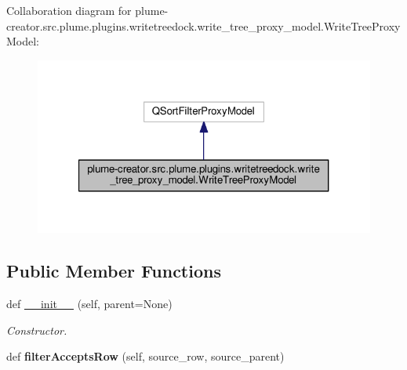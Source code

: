 Collaboration diagram for plume-\/creator.src.\+plume.\+plugins.\+writetreedock.\+write\+\_\+tree\+\_\+proxy\+\_\+model.\+Write\+Tree\+Proxy\+Model\+:\nopagebreak
\begin{figure}[H]
\begin{center}
\leavevmode
\includegraphics[width=321pt]{classplume-creator_1_1src_1_1plume_1_1plugins_1_1writetreedock_1_1write__tree__proxy__model_1_1_020a70b02c9b641d0e718f5cda0fbaef}
\end{center}
\end{figure}
\subsection*{Public Member Functions}
\begin{DoxyCompactItemize}
\item 
def \hyperlink{classplume-creator_1_1src_1_1plume_1_1plugins_1_1writetreedock_1_1write__tree__proxy__model_1_1_write_tree_proxy_model_a756c03ef93b08c58c6d7380358d37284}{\+\_\+\+\_\+init\+\_\+\+\_\+} (self, parent=None)\hypertarget{classplume-creator_1_1src_1_1plume_1_1plugins_1_1writetreedock_1_1write__tree__proxy__model_1_1_write_tree_proxy_model_a756c03ef93b08c58c6d7380358d37284}{}\label{classplume-creator_1_1src_1_1plume_1_1plugins_1_1writetreedock_1_1write__tree__proxy__model_1_1_write_tree_proxy_model_a756c03ef93b08c58c6d7380358d37284}

\begin{DoxyCompactList}\small\item\em Constructor. \end{DoxyCompactList}\item 
def {\bfseries filter\+Accepts\+Row} (self, source\+\_\+row, source\+\_\+parent)\hypertarget{classplume-creator_1_1src_1_1plume_1_1plugins_1_1writetreedock_1_1write__tree__proxy__model_1_1_write_tree_proxy_model_ab75bbfd6707957ea3632d7f85d2437b3}{}\label{classplume-creator_1_1src_1_1plume_1_1plugins_1_1writetreedock_1_1write__tree__proxy__model_1_1_write_tree_proxy_model_ab75bbfd6707957ea3632d7f85d2437b3}

\end{DoxyCompactItemize}


